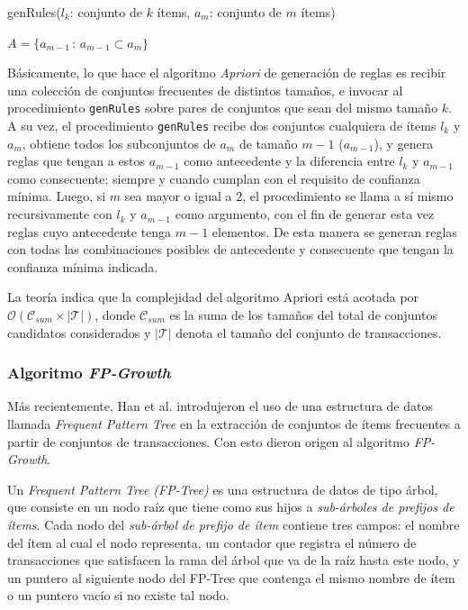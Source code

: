 \begin{procedure}[H]
\DontPrintSemicolon
{}
\caption{genRules($l_k$: conjunto de $k$ ítems, $a_m$: conjunto de $m$ ítems)}
$A = \{a_{m-1} \, : \, a_{m-1} \subset a_m\}$\;
\end{procedure}

Básicamente, lo que hace el algoritmo \textit{Apriori} de generación de reglas es recibir una colección de conjuntos frecuentes de distintos tamaños, e invocar al procedimiento \texttt{genRules} sobre pares de conjuntos que sean del mismo tamaño $k$. A su vez, el procedimiento \texttt{genRules} recibe dos conjuntos cualquiera de ítems $l_k$ y $a_m$, obtiene todos los subconjuntos de $a_m$ de tamaño $m-1$ ($a_{m-1}$), y genera reglas que tengan a estos $a_{m-1}$ como antecedente y la diferencia entre $l_k$ y $a_{m-1}$ como consecuente; siempre y cuando cumplan con el requisito de confianza mínima. Luego, si $m$ sea mayor o igual a 2, el procedimiento se llama a sí mismo recursivamente con $l_k$ y $a_{m-1}$ como argumento, con el fin de generar esta vez reglas cuyo antecedente tenga $m-1$ elementos. De esta manera se generan reglas con todas las combinaciones posibles de antecedente y consecuente que tengan la confianza mínima indicada.

La teoría indica que la complejidad del algoritmo Apriori está acotada por $\mathcal{O}(\mathcal{C}_{\mathit{sum}} \times |\mathcal{T}|)$, donde $\mathcal{C}_{\mathit{sum}}$ es la suma de los tamaños del total de conjuntos candidatos considerados y $|\mathcal{T}|$ denota el tamaño del conjunto de transacciones.

\subsubsection{Algoritmo \textit{FP-Growth}}

Más recientemente, Han et al. introdujeron el uso de una estructura de datos llamada \textit{Frequent Pattern Tree} \cite{han2004mining} en la extracción de conjuntos de ítems frecuentes a partir de conjuntos de transacciones. Con esto dieron origen al algoritmo \textit{FP-Growth}.

Un \textit{Frequent Pattern Tree (FP-Tree)} es una estructura de datos de tipo árbol, que consiste en un nodo raíz que tiene como sus hijos a \textit{sub-árboles de prefijos de ítems}. Cada nodo del \textit{sub-árbol de prefijo de ítem} contiene tres campos: el nombre del ítem al cual el nodo representa, un contador que registra el número de transacciones que satisfacen la rama del árbol que va de la raíz hasta este nodo, y un puntero al siguiente nodo del FP-Tree que contenga el mismo nombre de ítem o un puntero vacío si no existe tal nodo.

